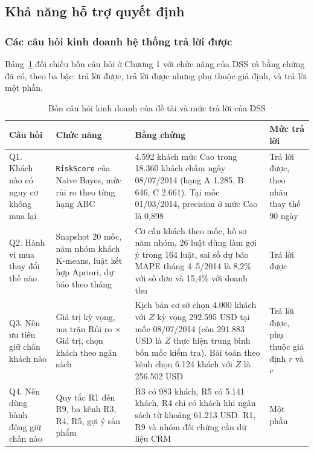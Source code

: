 \subsection{Khả năng hỗ trợ quyết định}
\subsubsection{Các câu hỏi kinh doanh hệ thống trả lời được}
Bảng~\ref{tab:cauhoi} đối chiếu bốn câu hỏi ở Chương 1 với chức năng của DSS và bằng chứng đã có, theo ba bậc: trả lời được, trả lời được nhưng phụ thuộc giả định, và trả lời một phần.

\begin{table}[!htbp]
\centering
\caption{Bốn câu hỏi kinh doanh của đề tài và mức trả lời của DSS}
\label{tab:cauhoi}
\footnotesize
\begin{tabular}{p{2.9cm}p{3.6cm}p{5.3cm}p{2.3cm}}
\toprule
Câu hỏi & Chức năng & Bằng chứng & Mức trả lời \\
\midrule
Q1. Khách nào có nguy cơ không mua lại & \texttt{RiskScore} của Naive Bayes, mức rủi ro theo từng hạng ABC & 4.592 khách mức Cao trong 18.360 khách chấm ngày 08/07/2014 (hạng A 1.285, B 646, C 2.661). Tại mốc 01/03/2014, precision ở mức Cao là 0,898 & Trả lời được, theo nhãn thay thế 90 ngày \\
Q2. Hành vi mua thay đổi thế nào & Snapshot 20 mốc, năm nhóm khách K-means, luật kết hợp Apriori, dự báo theo tháng & Cơ cấu khách theo mốc, hồ sơ năm nhóm, 26 luật dùng làm gợi ý trong 164 luật, sai số dự báo MAPE tháng 4--5/2014 là 8,2\% với số đơn và 15,4\% với doanh thu & Trả lời được \\
Q3. Nên ưu tiên giữ chân khách nào & Giá trị kỳ vọng, ma trận Rủi ro $\times$ Giá trị, chọn khách theo ngân sách & Kịch bản cơ sở chọn 4.000 khách với $Z$ kỳ vọng 292.595 USD tại mốc 08/07/2014 (còn 291.883 USD là $Z$ thực hiện trung bình bốn mốc kiểm tra). Bài toán theo kênh chọn 6.124 khách với $Z$ là 256.502 USD & Trả lời được, phụ thuộc giả định $r$ và $c$ \\
Q4. Nên dùng hành động giữ chân nào & Quy tắc R1 đến R9, ba kênh R3, R4, R5, gợi ý sản phẩm & R3 có 983 khách, R5 có 5.141 khách, R4 chỉ có khách khi ngân sách từ khoảng 61.213 USD. R1, R9 và nhóm đối chứng cần dữ liệu CRM & Một phần \\
\bottomrule
\end{tabular}
\end{table}

